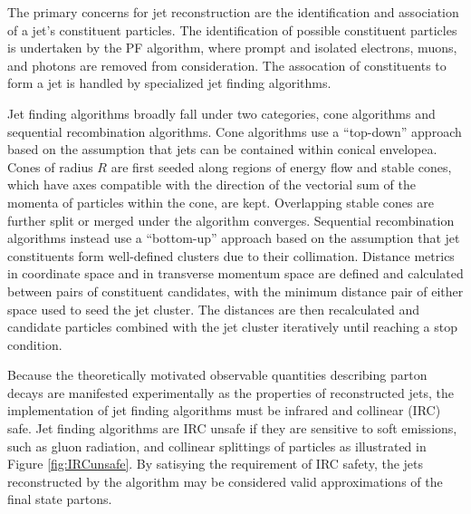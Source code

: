 The primary concerns for jet reconstruction are the identification and association of a jet's constituent particles. The identification of possible constituent particles is undertaken by the PF algorithm, where prompt and isolated electrons, muons, and photons are removed from consideration. The assocation of constituents to form a jet is handled by specialized jet finding algorithms.

Jet finding algorithms broadly fall under two categories, cone algorithms and sequential recombination algorithms. Cone algorithms use a ``top-down'' approach based on the assumption that jets can be contained within conical envelopea. Cones of radius $R$ are first seeded along regions of energy flow and stable cones, which have axes compatible with the direction of the vectorial sum of the momenta of particles within the cone, are kept. Overlapping stable cones are further split or merged under the algorithm converges. Sequential recombination algorithms instead use a ``bottom-up'' approach based on the assumption that jet constituents form well-defined clusters due to their collimation. Distance metrics in coordinate space and in transverse momentum space are defined and calculated between pairs of constituent candidates, with the minimum distance pair of either space used to seed the jet cluster. The distances are then recalculated and candidate particles combined with the jet cluster iteratively until reaching a stop condition.

Because the theoretically motivated observable quantities describing parton decays are manifested experimentally as the properties of reconstructed jets, the implementation of jet finding algorithms must be infrared and collinear (IRC) safe. Jet finding algorithms are IRC unsafe if they are sensitive to soft emissions, such as gluon radiation, and collinear splittings of particles as illustrated in Figure \ref{fig:IRCunsafe}. By satisying the requirement of IRC safety, the jets reconstructed by the algorithm may be considered valid approximations of the final state partons.

